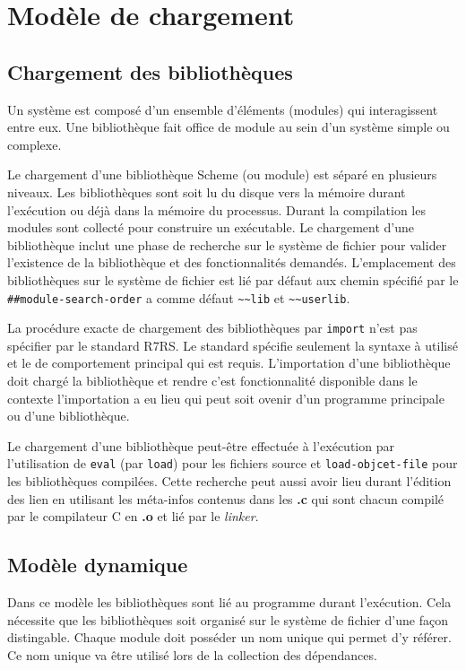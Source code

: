 
\chapter{Modèle de chargement}

\section{Chargement des bibliothèques}


Un système est composé d'un ensemble d'éléments (modules) qui interagissent
entre eux.  Une bibliothèque fait office de module au sein d'un système simple
ou complexe.

Le chargement d'une bibliothèque Scheme (ou module) est séparé en plusieurs niveaux.
Les bibliothèques sont soit lu du disque vers la mémoire durant l'exécution
ou déjà dans la mémoire du processus. Durant la compilation les modules sont
collecté pour construire un exécutable. Le chargement
d'une bibliothèque inclut une phase de recherche sur le système de fichier pour valider
l'existence de la bibliothèque et des fonctionnalités demandés. L'emplacement des
bibliothèques sur le système de fichier est lié par défaut aux chemin spécifié par
le \lstinline{##module-search-order} a comme défaut \lstinline{~~lib} et \lstinline{~~userlib}.


La procédure exacte de chargement des bibliothèques par \verb|import|
n'est pas spécifier par le standard R7RS. Le standard spécifie seulement la syntaxe
à utilisé et le de comportement principal qui est
requis. L'importation d'une bibliothèque doit chargé la bibliothèque
et rendre c'est fonctionnalité disponible dans le contexte
l'importation a eu lieu qui peut soit ovenir d'un programme principale
ou d'une bibliothèque.

Le chargement d'une bibliothèque peut-être effectuée à l'exécution par
l'utilisation de \texttt{eval} (par \texttt{load}) pour les fichiers source et
\texttt{load-objcet-file} pour les bibliothèques compilées. Cette recherche
peut aussi avoir lieu durant l'édition des lien en utilisant les méta-infos
contenus dans les \textbf{.c} qui sont chacun compilé par le compilateur C
en \textbf{.o} et lié par le \textit{linker}.

\section{Modèle dynamique}
Dans ce modèle les bibliothèques sont lié au programme durant l'exécution. Cela
nécessite que les bibliothèques soit organisé sur le système de fichier d'une façon
distingable. Chaque module doit posséder un nom unique qui permet d'y référer.
Ce nom unique va être utilisé lors de la collection des dépendances.


